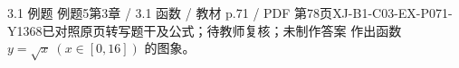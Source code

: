 \par\noindent\begin{minipage}{\linewidth}
\begin{bankitem}{3.1 例题 例题5}{第3章 / 3.1 函数 / 教材 p.71 / PDF 第78页}{XJ-B1-C03-EX-P071-Y1368}{已对照原页转写题干及公式；待教师复核；未制作答案}
作出函数 $y=\sqrt x\ (x\in[0,16])$ 的图象。
\end{bankitem}
\end{minipage}\par\medskip
